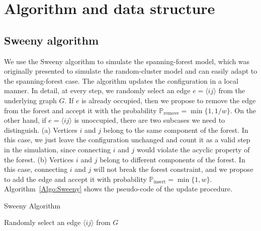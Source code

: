 \chapter{Algorithm and data structure}\label{chap:Algo}

\section{Sweeny algorithm}\label{sec:Sweeny}
We use the Sweeny algorithm\cite{Sweeny1983} to simulate the spanning-forest model, which was originally presented
to simulate the random-cluster model and can easily adapt to the spanning-forest case. The algorithm updates
the configuration in a local manner. In detail, at every step, we randomly select an edge $e = \langle i j \rangle$ from the underlying graph $G$. 
If $e$ is already occupied, then we propose to remove the edge from the forest and accept it with the probability
$\mathbb{P}_{\text{remove}} = \min\{1, 1/w\}$. On the other hand, if $e = \langle i j \rangle$ is unoccupied, there are two subcases we need to 
distinguish. (a) Vertices $i$ and $j$ belong to the same component of the forest. In this case, we just leave the
configuration unchanged and count it as a valid step in the simulation, since connecting $i$ and $j$ would violate the
acyclic property of the forest. (b) Vertices $i$ and $j$ belong to different components of the forest. In this case, connecting
$i$ and $j$ will not break the forest constraint, and we propose to add the edge and accept it with probability $\mathbb{P}_{\text{insert}} = \min\{1, w\}$. 
Algorithm~\ref{Algo:Sweeny} shows the pseudo-code of the update procedure.

\begin{algorithm}
\caption{Sweeny Algorithm} \label{Algo:Sweeny}
    Randomly select an edge $\langle ij \rangle$ from $G$\;
\end{algorithm}

